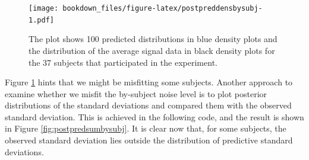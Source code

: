 \documentclass[12pt,]{krantz}
\newenvironment{Shaded}{\begin{snugshade}}{\end{snugshade}}
\newcommand{\ControlFlowTok}[1]{\textcolor[rgb]{0.13,0.29,0.53}{\textbf{#1}}}
\newcommand{\DataTypeTok}[1]{\textcolor[rgb]{0.13,0.29,0.53}{#1}}
\newcommand{\DecValTok}[1]{\textcolor[rgb]{0.00,0.00,0.81}{#1}}
\newcommand{\FloatTok}[1]{\textcolor[rgb]{0.00,0.00,0.81}{#1}}
\newcommand{\KeywordTok}[1]{\textcolor[rgb]{0.13,0.29,0.53}{\textbf{#1}}}
\newcommand{\NormalTok}[1]{#1}
\newcommand{\OperatorTok}[1]{\textcolor[rgb]{0.81,0.36,0.00}{\textbf{#1}}}
\newcommand{\OtherTok}[1]{\textcolor[rgb]{0.56,0.35,0.01}{#1}}
\newcommand{\StringTok}[1]{\textcolor[rgb]{0.31,0.60,0.02}{#1}}
\theoremstyle{definition}
\theoremstyle{definition}
\theoremstyle{definition}
\theoremstyle{remark}
\begin{document}
\begin{Shaded}
\end{Shaded}

\begin{figure}
\centering
\texttt{[image: bookdown\_files/figure-latex/postpreddensbysubj-1.pdf]}
\caption{\label{fig:postpreddensbysubj}The plot shows 100 predicted distributions in blue density plots and the distribution of the average signal data in black density plots for the 37 subjects that participated in the experiment.}
\end{figure}

Figure \ref{fig:postpreddensbysubj} hints that we might be misfitting some subjects. Another approach to examine whether we misfit the by-subject noise level is to plot posterior distributions of the standard deviations and compared them with the observed standard deviation. This is achieved in the following code, and the result is shown in Figure \ref{fig:postpredsumbysubj}. It is clear now that, for some subjects, the observed standard deviation lies outside the distribution of predictive standard deviations.
\end{document}

